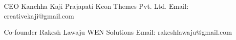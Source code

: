 
\begin{cventries}
  
   \cventry
    {CEO} %
    {Kanchha Kaji Prajapati} %
    {Keon Themes Pvt. Ltd.} %
    {} %
    {Email: creativekaji@gmail.com } %
    
  \cventry
    {Co-founder} %
    {Rakesh Lawaju} %
    {WEN Solutions} %
    {} %
    {Email: rakeshlawaju@gmail.com} %

\end{cventries}